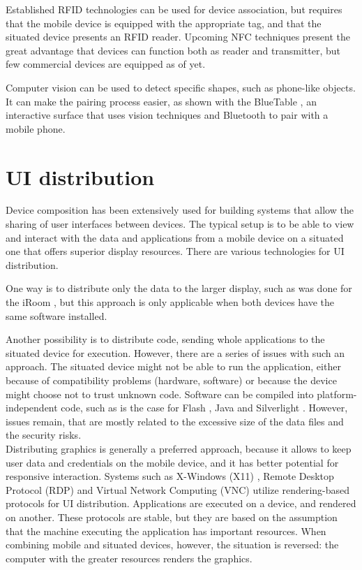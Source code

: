 Established RFID technologies can be used for device association, but requires that the mobile device is equipped with the appropriate tag, and that the situated device presents an RFID reader.
Upcoming NFC techniques present the great advantage that devices can function both as reader and transmitter, but few commercial devices are equipped as of yet.

Computer vision can be used to detect specific shapes, such as phone-like objects.
It can make the pairing process easier, as shown with the BlueTable \citep{Wilson:2007:bluetable}, an interactive surface that uses vision techniques and Bluetooth to pair with a mobile phone.

\section{UI distribution}
\label{sec:rwdistribution}

Device composition has been extensively used for building systems that allow the sharing of user interfaces between devices.
The typical setup is to be able to view and interact with the data and applications from a mobile device on a situated one that offers superior display resources.
There are various technologies for UI distribution.

One way is to distribute only the data to the larger display, such as was done for the iRoom \citep{Johanson:2002:iroom}, but this approach is only applicable when both devices have the same software installed.

Another possibility is to distribute code, sending whole applications to the situated device for execution.
However, there are a series of issues with such an approach.
The situated device might not be able to run the application, either because of compatibility problems (hardware, software) or because the device might choose not to trust unknown code.
Software can be compiled into platform-independent code, such as is the case for Flash \citep{flash}, Java \citep{java} and Silverlight \citep{silverlight}.
However, issues remain, that are mostly related to the excessive size of the data files and the security risks.
\\
\linebreak
Distributing graphics is generally a preferred approach, because it allows to keep user data and credentials on the mobile device, and it has better potential for responsive interaction.
Systems such as X-Windows (X11) \citep{Scheifler:1986:x11}, Remote Desktop Protocol (RDP) \citep{Tritsch:2003:rdp} and Virtual Network Computing (VNC) \citep{Richardson:1998:vnc} utilize rendering-based protocols for UI distribution.
Applications are executed on a device, and rendered on another.
These protocols are stable, but they are based on the assumption that the machine executing the application has important resources.
When combining mobile and situated devices, however, the situation is reversed: the computer with the greater resources renders the graphics.

